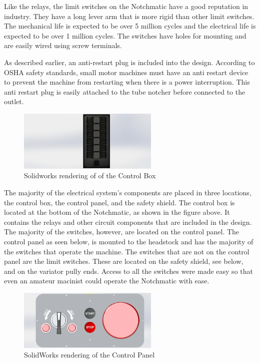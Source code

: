 Like the relays, the limit switches on the Notchmatic have a good reputation in industry. They have a long lever arm that is more rigid than other limit switches. The mechanical life is expected to be over 5 million cycles and the electrical life is expected to be over 1 million cycles. The switches have holes for mounting and are easily wired using screw terminals.

As described earlier, an anti-restart plug is included into the design. According to OSHA safety standards, small motor machines must have an anti restart device to prevent the machine from restarting when there is a power interruption. This anti restart plug is easily attached to the tube notcher before connected to the outlet.

\newpage
\begin{figure}[H]
    \centering
    \includegraphics[width=0.6\textwidth]{./images/Chapter2-MachineDescription/ControlBox}
    \caption{Solidworks rendering of of the Control Box}
    \label{fig:Control Boxl}
\end{figure} 

The majority of the electrical system's components are placed in three locations, the control box, the control panel, and the safety shield. The control box is located at the bottom of the Notchmatic, as shown in the figure above. It contains the relays and other circuit components that are included in the design. The majority of the switches, however, are located on the control panel. The control panel as seen below, is mounted to the headstock and has the majority of the switches that operate the machine. The switches that are not on the control panel are the limit switches. These are located on the safety shield, see below, and on the variator pully ends. Access to all the switches were made easy so that even an amateur macinist could operate the Notchmatic with ease. 

\begin{figure}[htp]
    \centering
    \includegraphics[width=0.6\textwidth]{./images/Chapter2-MachineDescription/ControlPanel}
    \caption{SolidWorks rendering of the Control Panel}
    \label{fig:Control Panel}
\end{figure}
 
